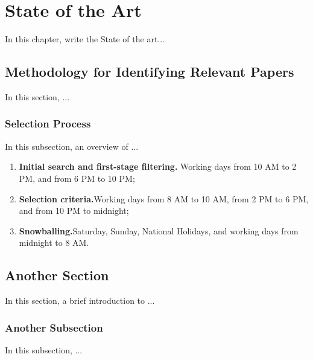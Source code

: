 \chapter{State of the Art}
\label{cha:soa}
\vspace{0.4 cm}

In this chapter, write the State of the art...


\section{Methodology for Identifying Relevant Papers}
\label{sec:papaer_survey_methodology}
\vspace{0.2 cm}

In this section, ...

\vspace{0.1 cm}
\subsection{Selection Process}
\label{sec:selection_process}
\vspace{0.1 cm}

In this subsection, an overview of ...

\begin{enumerate}[label=\textbf{\arabic*.}]
  \item\textbf{Initial search and first-stage filtering.} Working days from 10 AM to 2 PM, and from 6 PM to 10 PM;
  \item\textbf{Selection criteria.}Working days from 8 AM to 10 AM, from 2 PM to 6 PM, and from 10 PM to midnight;
  \item\textbf{Snowballing.}Saturday, Sunday, National Holidays, and working days from midnight to 8 AM.
\end{enumerate}

\section{Another Section}
\label{sec:timeseries}
\vspace{0.2 cm}

In this section, a brief introduction to ... 



\vspace{0.1 cm}
\subsection{Another Subsection}
\label{sec:automl}
\vspace{0.1 cm}

In this subsection, ...